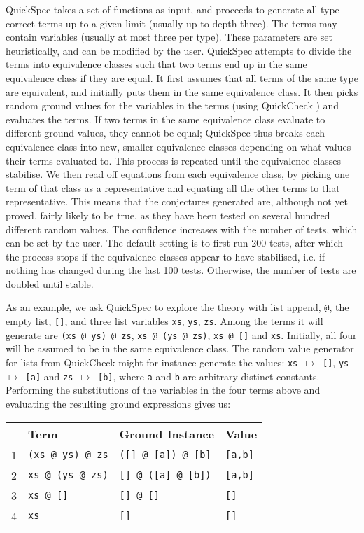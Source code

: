 QuickSpec takes a set of functions as input, and proceeds to generate all
type-correct terms up to a given limit (usually up to depth three). 
The terms may contain variables (usually at most three per type). 
These parameters are set heuristically, and can be modified by the user. 
QuickSpec attempts to divide the terms into equivalence classes such
that two terms end up in the same equivalence class if they are equal.
It first assumes that all terms of the same
type are equivalent, and initially puts them in the same equivalence class. 
It then picks random ground values for the variables in the terms
(using QuickCheck \cite{quickcheck}) and evaluates the terms.
If two terms in the same equivalence class evaluate to different
ground values, they cannot be equal; QuickSpec thus breaks each equivalence
class into new, smaller equivalence classes depending on what values
their terms evaluated to. This process is repeated until the
equivalence classes stabilise. We then read off equations from each
equivalence class, by picking one term of that class as a
representative and equating all the other terms to that representative.
This means that the conjectures
generated are, although not yet proved, fairly likely to be true, as they have been tested on several hundred different random values. The confidence increases with the number of tests, which can be set by the user. The default setting is to first run 200 tests, after which the process stops if the equivalence classes appear to have stabilised, i.e. if nothing has changed during the last 100 tests. Otherwise, the number of tests are doubled until stable.

As an example, we ask QuickSpec to explore the theory with list append,
\verb~@~, the empty list, \verb~[]~, and three list variables \verb~xs~,
\verb~ys~, \verb~zs~. Among the terms it will generate are
\verb~(xs @ ys) @ zs~, \verb~xs @ (ys @ zs)~, \verb~xs @ []~ and \verb~xs~.
Initially, all four will be assumed to be in the same equivalence class.
The random value generator for lists from QuickCheck might for instance generate the values: \texttt{xs $\mapsto$ []}, \hbox{\texttt{ys $\mapsto$ [a]}} and \texttt{zs $\mapsto$ [b]}, where \texttt{a} and \texttt{b} are arbitrary distinct constants. Performing the substitutions of the variables in the four terms above and evaluating the resulting ground expressions gives us:

\begin{tabularx}{\textwidth}{l  X  X  X}
 & Term & Ground Instance & Value \\
 \hline
1 \quad &\texttt{(xs @ ys) @ zs} & \texttt{([] @ [a]) @ [b]} & \texttt{[a,b]} \\
2 \quad&\texttt{xs @ (ys @ zs)} &\texttt{[] @ ([a] @ [b])} & \texttt{[a,b]}\\
3 \quad&\texttt{xs @ []} & \texttt{[] @ []} & \texttt{[]} \\
4 \quad &\texttt{xs} &\texttt{[]} & \texttt{[]} \\
\end{tabularx}

